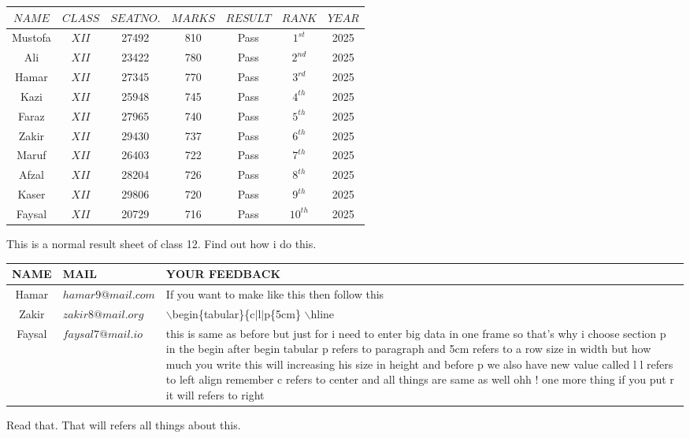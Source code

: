 \documentclass[11pt]{article}
\begin{document}
\vspace{1cm}

\begin{tabular}{|c|c|c|c|c|c|c|}
\hline
$NAME$ & $CLASS$ & $SEAT NO.$ & $MARKS$ & $RESULT$ & $RANK$ & $YEAR$ \\ \hline
Mustofa & $XII$ &  27492 & 810 & Pass & $1^{st}$ & 2025 \\ \hline
Ali & $XII$ &  23422 & 780 & Pass & $2^{nd}$ & 2025 \\ \hline
Hamar & $XII$ &  27345 & 770 & Pass & $3^{rd}$ & 2025 \\ \hline
Kazi & $XII$ &  25948 & 745 & Pass & $4^{th}$ & 2025 \\ \hline
Faraz & $XII$ &  27965 & 740 & Pass & $5^{th}$ & 2025 \\ \hline
Zakir & $XII$ &  29430 & 737 & Pass & $6^{th}$ & 2025 \\ \hline
Maruf & $XII$ &  26403 & 722 & Pass & $7^{th}$ & 2025 \\ \hline
Afzal & $XII$ &  28204 & 726 & Pass & $8^{th}$ & 2025 \\ \hline
Kaser & $XII$ &  29806 & 720 & Pass & $9^{th}$ & 2025 \\ \hline
Faysal & $XII$ &  20729 & 716 & Pass & $10^{th}$ & 2025 \\ \hline



\end{tabular}

\vspace{1cm}

 This is a normal result sheet of class 12. Find out how i do this.
 
 \pagebreak

\begin{tabular}{|c|l|p{5cm}|}
\hline
NAME & MAIL & YOUR FEEDBACK \\ \hline

Hamar & $hamar9@mail.com$ & If you want to make like this then follow this \\ \hline
Zakir & $zakir8@mail.org$ & $\backslash$begin\{tabular\}\{c$|$l$|$p\{5cm\} $\backslash$hline \\ \hline
Faysal & $faysal7@mail.io$ & this is same as before but just for i need to enter big data in one frame so that's why i choose section {p} in the begin after begin tabular p refers to paragraph and {5cm} refers to a row size in width but how much you write this will increasing his size in height and before p we also have new value called {l} l refers to left align remember c refers to center and all things are same as well ohh ! one more thing if you put {r} it will refers to right \\ \hline
\end{tabular}

\vspace{1cm}

Read that. That will refers all things about this.
\end{document}
